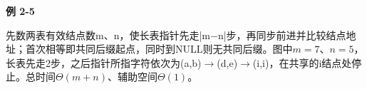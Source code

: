 {\color{ink}\bfseries 例 2-5}\par\vspace{1bp}先数两表有效结点数m、n，使长表指针先走|m\(-\)n|步，再同步前进并比较结点地址；首次相等即共同后缀起点，同时到NULL则无共同后缀。图中\(m=\allowbreak{}7\)、\(n=\allowbreak{}5\)，长表先走2步，之后指针所指字符依次为(a,\allowbreak{}b)\(\to \)(d,\allowbreak{}e)\(\to \)(i,\allowbreak{}i)，在共享的i结点处停止。总时间\(\Theta (m+\allowbreak{}n)\)、辅助空间\(\Theta (1)\)。
